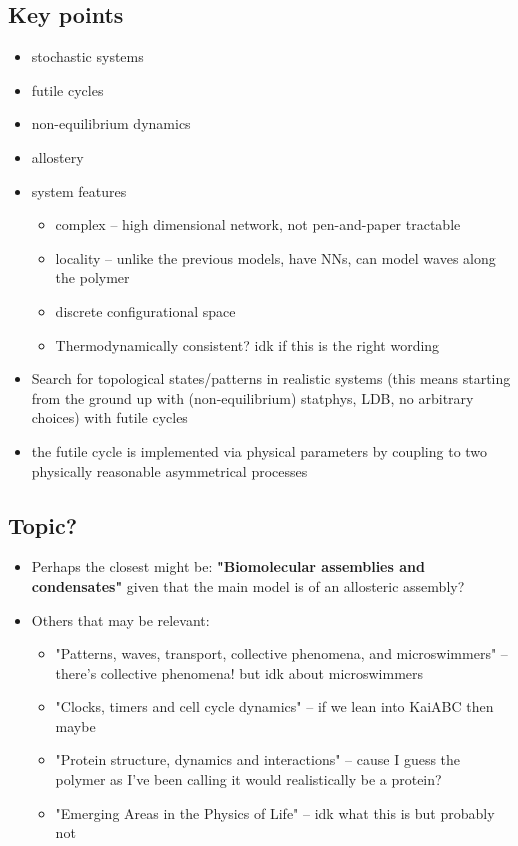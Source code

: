 \documentclass[11pt]{article}
\begin{document}
\subsection{Key points}
\begin{itemize}
	\item stochastic systems
	\item futile cycles
	\item non-equilibrium dynamics
	\item allostery
	\item system features
	      \begin{itemize}
		      \item complex -- high dimensional network, not pen-and-paper tractable
		      \item locality -- unlike the previous models, have NNs, can model waves along the polymer
		      \item discrete configurational space
		      \item Thermodynamically consistent? idk if this is the right wording
	      \end{itemize}
	\item Search for topological states/patterns in realistic systems (this means starting from the ground up with (non-equilibrium) statphys, LDB, no arbitrary choices) with futile cycles
	\item the futile cycle is implemented via physical parameters by coupling to two physically reasonable asymmetrical processes
\end{itemize}
\subsection{Topic?}
\begin{itemize}
	\item Perhaps the closest might be: \textbf{"Biomolecular assemblies and condensates"} given that the main model is of an allosteric assembly?
	\item Others that may be relevant:
	      \begin{itemize}
		      \item "Patterns, waves, transport, collective phenomena, and microswimmers" -- there's collective phenomena! but idk about microswimmers
		      \item "Clocks, timers and cell cycle dynamics" -- if we lean into KaiABC then maybe
		      \item "Protein structure, dynamics and interactions" -- cause I guess the polymer as I've been calling it would realistically be a protein?
		      \item "Emerging Areas in the Physics of Life" -- idk what this is but probably not
	      \end{itemize}
\end{itemize}
\end{document}
